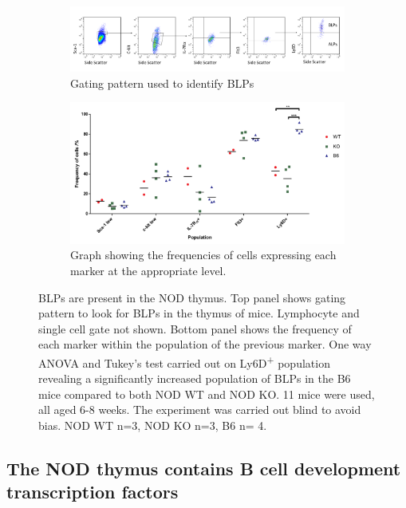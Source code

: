 \begin{figure}
	\begin{subfigure}{\textwidth}
	\includegraphics[width=\textwidth]{Figures/BLPgating.png}
	\caption{Gating pattern used to identify BLPs}
	\label{subfig:BLPgating}
	\end{subfigure}
	\begin{subfigure}{\textwidth}
	\includegraphics[width=\textwidth]{Figures/ProgenitorMarkers.pdf}
	\caption{Graph showing the frequencies of cells expressing each marker at the appropriate level.}
	\label{subfig:BLPgraph}
	\end{subfigure}
\caption[BLPs are significantly decreased in the NOD thymus compared to the B6 thymus]{BLPs are present in the NOD thymus. 
Top panel shows gating pattern to look for BLPs in the thymus of mice. Lymphocyte and single cell gate not shown.
Bottom panel shows the frequency of each marker within the population of the previous marker.
One way ANOVA and Tukey's test carried out on Ly6D\textsuperscript{+} population revealing a significantly increased population of BLPs in the B6 mice compared to both NOD WT and NOD KO.
11 mice were used, all aged 6-8 weeks. 
The experiment was carried out blind to avoid bias. 
NOD WT n=3, NOD KO n=3, B6 n= 4.}
\label{fig:BLPs}
\end{figure}



\subsection{The NOD thymus contains B cell development transcription factors}
\label{subsec:TFs}

